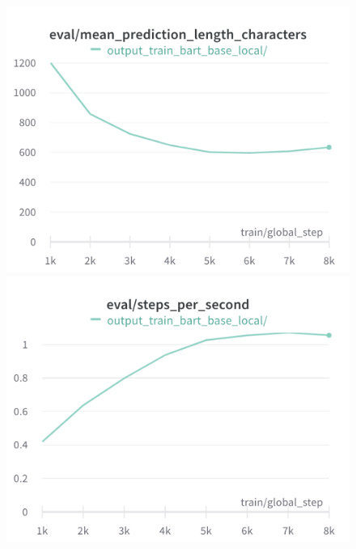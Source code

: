\documentclass{article}
\begin{document}
\begin{figure}[!htb]
\includegraphics[width=\linewidth]{charts/Section-4-Panel-0-mbqkjnm1l}
\caption{}
\endminipage\hfill
{}
\includegraphics[width=\linewidth]{charts/Section-4-Panel-1-rouuz3suq}
\caption{}
\endminipage
\end{figure}
\end{document}
